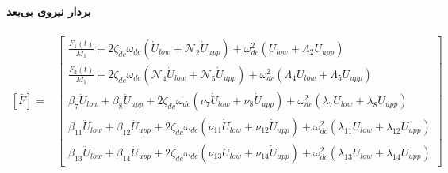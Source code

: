 \paragraph{بردار نیروی بی‌بعد}
\begin{equation}\label{Eq.force_vector_dimensionless}
\begin{aligned}
[\bar{F}] = & \begin{bmatrix}
\frac{F_1(t)}{M_1} + 2 \zeta_{dc} \omega_{dc} (\dot{U}_{low} + \mathcal{N}_2 \dot{U}_{upp}) + \omega_{dc}^2 (U_{low} + \Lambda_2 U_{upp})\\
\frac{F_2(t)}{M_1} + 2 \zeta_{dc} \omega_{dc} (\mathcal{N}_4 \dot{U}_{low} + \mathcal{N}_5 \dot{U}_{upp}) + \omega_{dc}^2 (\Lambda_4 U_{low} + \Lambda_5 U_{upp}) \\
\beta_7 \ddot{U}_{low} +  \beta_8 \ddot{U}_{upp} +  2 \zeta_{dc} \omega_{dc} (\nu_7 \dot{U}_{low} + \nu_8 \dot{U}_{upp}) +\omega_{dc}^2 (\lambda_7 U_{low} + \lambda_8 U_{upp})\\
\beta_{11} \ddot{U}_{low} +  \beta_{12} \ddot{U}_{upp} +  2 \zeta_{dc} \omega_{dc} (\nu_{11} \dot{U}_{low} + \nu_{12} \dot{U}_{upp}) +\omega_{dc}^2 (\lambda_{11} U_{low} + \lambda_{12} U_{upp})\\
\beta_{13} \ddot{U}_{low} +  \beta_{14} \ddot{U}_{upp} +  2 \zeta_{dc} \omega_{dc} (\nu_{13} \dot{U}_{low} + \nu_{14} \dot{U}_{upp}) +\omega_{dc}^2 (\lambda_{13} U_{low} + \lambda_{14} U_{upp})
\end{bmatrix}
\end{aligned}
\end{equation}
